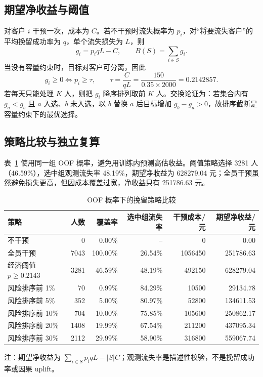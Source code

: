\documentclass[UTF8,a4paper,11pt]{ctexart}
\begin{document}
\subsection{期望净收益与阈值}
对客户 \(i\) 干预一次，成本为 \(C\)。若不干预时流失概率为 \(p_i\)，对“将要流失客户”的平均挽留成功率为 \(q\)，单个流失损失为 \(L\)，则
\begin{equation}
g_i=p_iqL-C,
\qquad B(S)=\sum_{i\in S}g_i.
\label{eq:net-v2}
\end{equation}
当没有容量约束时，目标对客户可分离，因此
\begin{equation}
g_i\ge0\Longleftrightarrow p_i\ge\tau,
\qquad \tau=\frac{C}{qL}=\frac{150}{0.35\times2000}=0.2142857.
\label{eq:threshold-v2}
\end{equation}
若每天只能处理 \(K\) 人，则把 \(g_i\) 降序排列取前 \(K\) 人。交换论证为：若集合内有 \(g_a<g_b\) 且 \(a\) 入选、\(b\) 未入选，以 \(b\) 替换 \(a\) 后目标增加 \(g_b-g_a>0\)，故排序截断是容量约束下的最优选择。

\subsection{策略比较与独立复算}
表~\ref{tab:q3-policy-v2} 使用同一组 OOF 概率，避免用训练内预测高估收益。阈值策略选择 3281 人（46.59\%），选中组观测流失率 48.19\%，期望净收益为 628279.04 元；全员干预虽然避免损失更高，但因成本覆盖过宽，净收益只有 251786.63 元。

\begin{table}[H]
\centering
\caption{OOF 概率下的挽留策略比较}
\label{tab:q3-policy-v2}
\scriptsize
\setlength{\tabcolsep}{3pt}
\begin{tabular}{@{}lrrrrr@{}}
\toprule
策略&人数&覆盖率&选中组流失率&干预成本/元&期望净收益/元\\
\midrule
不干预&0&0.00\%&--&0&0.00\\
全员干预&7043&100.00\%&26.54\%&1056450&251786.63\\
经济阈值 \(p\ge0.2143\)&3281&46.59\%&48.19\%&492150&628279.04\\
风险排序前 1\%&70&0.99\%&84.29\%&10500&29134.78\\
风险排序前 5\%&352&5.00\%&80.97\%&52800&134611.53\\
风险排序前 10\%&704&10.00\%&75.85\%&105600&250862.17\\
风险排序前 20\%&1408&19.99\%&67.54\%&211200&437095.34\\
风险排序前 30\%&2112&29.99\%&58.90\%&316800&559067.74\\
\bottomrule
\end{tabular}
\begin{tablenotes}
\footnotesize\item 注：期望净收益为 \(\sum_{i\in S}p_iqL-|S|C\)；观测流失率是描述性校验，不是挽留成功率或因果 uplift。
\end{tablenotes}
\end{table}
\end{document}
